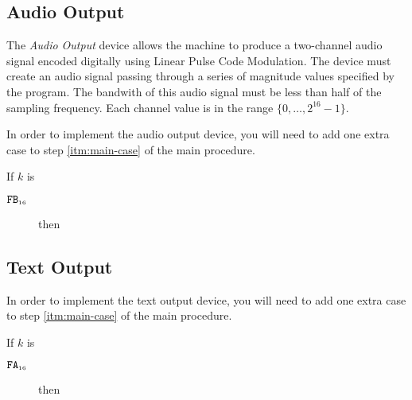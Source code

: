 \documentclass[a4paper,12pt]{article}
\newcommand{\num}[1]{\texttt{#1}}
\newcommand{\hex}[1]{\num{#1}_{\textup{\tiny 16}}}
\newcommand{\range}[2]{\{#1,\ldots,#2\}}
\newcommand{\proc}[1]{\textsc{#1}}
\newcommand{\deviceio}[1]{$\langle$#1$\rangle$}
\newcommand{\op}[1]{$#1$}
\theoremstyle{definition}
\newcommand{\PUTCHAR}   [1]{\op{\hex{FA}}}
\newcommand{\ADDSAMPLE} [1]{\op{\hex{FB}}}
\begin{document}
\subsection{Audio Output}

The \emph{Audio Output} device allows the machine to produce a two-channel audio signal encoded digitally using Linear Pulse Code Modulation.
The device must create an audio signal passing through a series of magnitude values specified by the program.
The bandwith of this audio signal must be less than half of the sampling frequency.
Each channel value is in the range $\range{0}{2^{16}-1}$.

In order to implement the audio output device, you will need to add one extra case to step \ref{itm:main-case} of the main procedure.

\begin{stepnumbers}[start=3]
\item If $k$ is
  \begin{description}
  \item[\ADDSAMPLE{}] then
  \end{description}
\end{stepnumbers}

\subsection{Text Output}

In order to implement the text output device, you will need to add one extra case to step \ref{itm:main-case} of the main procedure.

\begin{stepnumbers}[start=3]
  \setcounter{enumi}{2}
\item If $k$ is
  \begin{description}
  \item[\PUTCHAR{}] then
  \end{description}
\end{stepnumbers}
\end{document}
